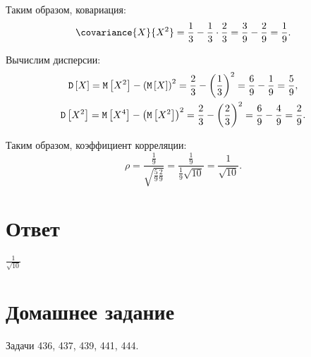 \documentclass[a4paper,12pt]{article}
\begin{document}
    Таким образом, ковариация:
    \begin{equation}
        \covariance{X}{X^2} = \frac{1}{3} - \frac{1}{3} \cdot \frac{2}{3} = \frac{3}{9} - \frac{2}{9} = \frac{1}{9} .
    \end{equation}

    Вычислим дисперсии:
    \begin{gather}
        \mathtt{D} \left [ X \right ] = \mathtt{M} \left [ X^2 \right ] - \left ( \mathtt{M} \left [ X \right ] \right )^2 = \frac{2}{3} - \left ( \frac{1}{3} \right )^2 = \frac{6}{9} - \frac{1}{9} = \frac{5}{9} , \\
        \mathtt{D} \left [ X^2 \right ] = \mathtt{M} \left [ X^4 \right ] - \left ( \mathtt{M} \left [ X^2 \right ] \right )^2 = \frac{2}{3} - \left ( \frac{2}{3} \right )^2 = \frac{6}{9} - \frac{4}{9} = \frac{2}{9}.
    \end{gather}

    Таким образом, коэффициент корреляции:
    \begin{equation}
        \rho = \frac{\frac{1}{9}}{\sqrt{\frac{5}{9} \frac{2}{9}}} = \frac{\frac{1}{9}}{\frac{1}{9} \sqrt{10}} = \frac{1}{\sqrt{10}} .
    \end{equation}

    \section*{Ответ}
    $\frac{1}{\sqrt{10}}$


    \section{Домашнее задание}

    Задачи 436, 437, 439, 441, 444.
\end{document}
